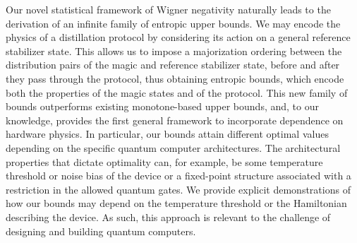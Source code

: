 \documentclass[12pt]{letter}
\begin{document}
Our novel statistical framework of Wigner negativity naturally leads to the derivation of an infinite family of entropic upper bounds.
We may encode the physics of a distillation protocol by considering its action on a general reference stabilizer state.
This allows us to impose a majorization ordering between the distribution pairs of the magic and reference stabilizer state, before and after they pass through the protocol, thus obtaining entropic bounds, which encode both the properties of the magic states and of the protocol.
This new family of bounds outperforms existing monotone-based upper bounds, and, to our knowledge, provides the first general framework to incorporate dependence on hardware physics. 
In particular, our bounds attain different optimal values depending on the specific quantum computer architectures. 
The architectural properties that dictate optimality can, for example, be some temperature threshold or noise bias of the device or a fixed-point structure associated with a restriction in the allowed quantum gates. 
We provide explicit demonstrations of how our bounds may depend on the temperature threshold or the Hamiltonian describing the device.
As such, this approach is relevant to the challenge of designing and building quantum computers.
\end{document}
